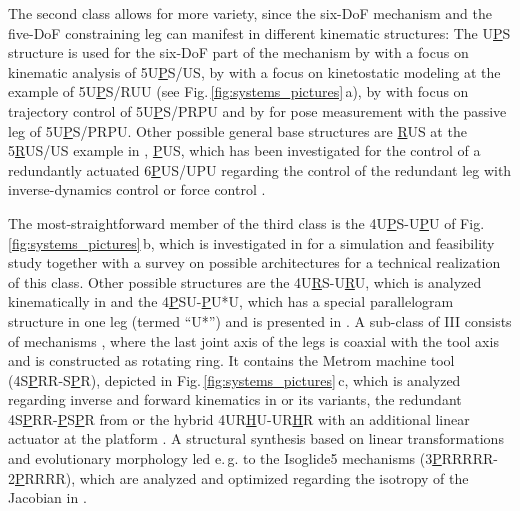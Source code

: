 \documentclass[robotics,article,submit,moreauthors,pdftex]{Definitions/mdpi}
\begin{document}
The second class allows for more variety, since the six-DoF mechanism and the five-DoF constraining leg can manifest in different kinematic structures:
The U\underline{P}S structure is used for the six-DoF part of the mechanism 
  by \cite{WangGos1997} with a focus on kinematic analysis of 5U\underline{P}S/US, 
  by \cite{ZhangGos2001} with a focus on kinetostatic modeling at the example of 5U\underline{P}S/RUU (see Fig.\,\ref{fig:systems_pictures}\,a), 
  by \cite{ZhengGaoZha2005} with focus on trajectory control of 5U\underline{P}S/PRPU and 
  by \cite{GaoSunZha2004} for pose measurement with the passive leg of 5U\underline{P}S/PRPU.
Other possible general base structures are \underline{R}US at the 5\underline{R}US/US example in \cite{WangGos1997}, \underline{P}US, which has been investigated for the control of a redundantly actuated 6\underline{P}US/UPU regarding the control of the redundant leg with inverse-dynamics control \cite{LiuXuYaoXu2015} or force control \cite{WenQinZhaLam2016}.

The most-straightforward member of the third class is the 4U\underline{P}S-U\underline{P}U of Fig.\,\ref{fig:systems_pictures}\,b, which is investigated in \cite{MbarekNefCor2005} for a simulation and feasibility study together with a survey on possible architectures for a technical realization of this class.
Other possible structures are 
  the 4U\underline{R}S-U\underline{R}U, which is analyzed kinematically in \cite{SchreiberGos2003} and
  the 4\underline{P}SU-\underline{P}U*U, which has a special parallelogram structure in one leg (termed ``U*'') and is presented in \cite{GaoPenZhaLi2006}.
A sub-class of III consists of mechanisms \cite{BaerWei2006,LinLiYanZha2013,AlaghebandMahMilBen2015}, where the last joint axis of the legs is coaxial with the tool axis and is constructed as rotating ring.
It contains the
  Metrom machine tool (4S\underline{P}RR-S\underline{P}R), depicted in Fig.\,\ref{fig:systems_pictures}\,c, which is analyzed regarding inverse and forward kinematics in \cite{BaerWei2006} or its variants, 
  the redundant 4S\underline{P}RR-\underline{P}S\underline{P}R from \cite{AlaghebandMahMilBen2015} or 
  the hybrid 4UR\underline{H}U-UR\underline{H}R with an additional linear actuator at the platform \cite{LinLiYanZha2013}.
A structural synthesis based on linear transformations and evolutionary morphology \cite{Gogu2008} led e.\,g. to the Isoglide5 mechanisms (3\underline{P}RRRRR-2\underline{P}RRRR), which are analyzed and optimized regarding the isotropy of the Jacobian in \cite{Gogu2006}.
\end{document}
